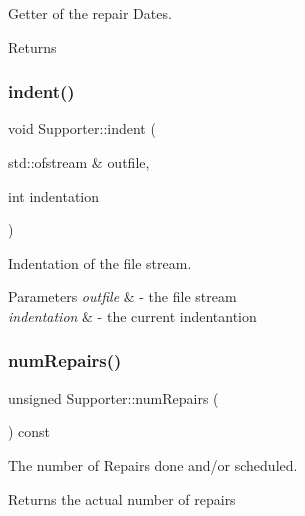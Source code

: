 Getter of the repair Dates. 

\begin{DoxyReturn}{Returns}

\end{DoxyReturn}
\mbox{\label{class_supporter_a89df253d9584e976d6ab40533f79c3d8}} 
\subsubsection{\texorpdfstring{indent()}{indent()}}
{\footnotesize\ttfamily void Supporter\+::indent (\begin{DoxyParamCaption}\item[{std\+::ofstream \&}]{outfile,  }\item[{int}]{indentation }\end{DoxyParamCaption})}



Indentation of the file stream. 


\begin{DoxyParams}{Parameters}
{\em outfile} & -\/ the file stream \\
\hline
{\em indentation} & -\/ the current indentantion \\
\hline
\end{DoxyParams}
\mbox{\label{class_supporter_aee39413490bb66dc13fd3b96e7d87a81}} 
\subsubsection{\texorpdfstring{num\+Repairs()}{numRepairs()}}
{\footnotesize\ttfamily unsigned Supporter\+::num\+Repairs (\begin{DoxyParamCaption}{ }\end{DoxyParamCaption}) const}



The number of Repairs done and/or scheduled. 

\begin{DoxyReturn}{Returns}
the actual number of repairs 
\end{DoxyReturn}
\mbox{\label{class_supporter_a16db113edaeb5f727c27b85871d28506}} 
